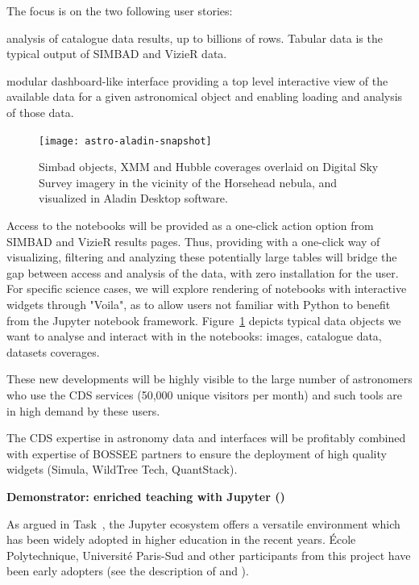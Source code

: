   The focus is on the two following user stories:
    \begin{compactitem}
        \item analysis of catalogue data results, up to billions of rows.
              Tabular data is the typical output of SIMBAD and VizieR data.
        \item modular dashboard-like interface providing a top level
              interactive view of the available data for a given astronomical
              object and enabling loading and analysis of those data.
    \end{compactitem}


\begin{figure}[ht!]\centering
  \texttt{[image: astro-aladin-snapshot]}
  \caption{Simbad objects, XMM and Hubble coverages overlaid on Digital Sky Survey imagery in the vicinity of the Horsehead nebula, and visualized in Aladin Desktop software.}\label{fig:astro-aladin-snapshot}
\end{figure}

  Access to the notebooks will be provided as a one-click action option from
  SIMBAD and VizieR results pages.
  Thus, providing with a one-click way of visualizing, filtering and analyzing
these potentially large tables will bridge the gap between access and analysis
of the data, with zero installation for the user.
  For specific science cases, we will explore rendering of notebooks with
  interactive widgets through "Voila", as to allow users not familiar with
  Python to benefit from the Jupyter notebook framework.
  Figure~\ref{fig:astro-aladin-snapshot} depicts typical data objects we want to analyse and interact with in the notebooks: images, catalogue data, datasets coverages.

  These new developments will be highly visible to the large number of astronomers who use the CDS services (50,000 unique visitors per month) and such tools are in high demand by these users.

  The CDS expertise in astronomy data and interfaces will be profitably combined with expertise of BOSSEE partners to ensure the deployment of high quality widgets (Simula, WildTree Tech, QuantStack).

\medskip
\textbf{Demonstrator: enriched teaching with Jupyter ()}\label{sec:concept-demonstrator-teaching}

  As argued in Task~, the Jupyter
  ecosystem offers a versatile environment which has been widely
  adopted in higher education in the recent years. École
  Polytechnique, Université Paris-Sud and other participants from this
  project have been early adopters (see the description of 
  and ).

